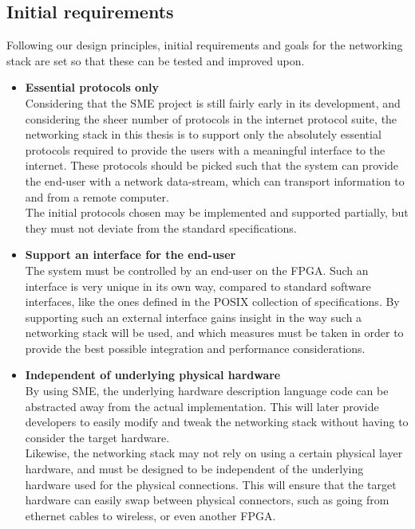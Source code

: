 \subsection{Initial requirements}
Following our design principles, initial requirements and goals for the
networking stack are set so that these can be tested and improved upon.
\begin{itemize}
\item \textbf{Essential protocols only}\\
Considering that the SME project is still fairly early in its development, and considering
the sheer number of protocols in the internet protocol suite, the networking
stack in this thesis is to support only the absolutely essential protocols
required to provide the users with a meaningful interface to the internet.
These protocols should be picked such that the system can provide the end-user
with a network data-stream, which can transport information to and from a remote
computer.\\
The initial protocols chosen may be implemented and supported partially, but
they must not deviate from the standard specifications.

\item \textbf{Support an interface for the end-user}\\
The system must be controlled by an end-user on the FPGA. Such an interface is
very unique in its own way, compared to standard software interfaces, like the
ones defined in the POSIX collection of specifications. By supporting such an
external interface gains insight in the way such a networking stack will be used,
and which measures must be taken in order to provide the best possible integration
and performance considerations.

\item \textbf{Independent of underlying physical hardware}\\
By using SME, the underlying hardware description language code can be abstracted
away from the actual implementation. This will later provide developers to easily
modify and tweak the networking stack without having to consider the target
hardware.\\
Likewise, the networking stack may not rely on using a certain physical layer hardware,
and must be designed to be independent of the underlying hardware used for the
physical connections. This will ensure that the target hardware can easily
swap between physical connectors, such as going from ethernet cables to wireless,
or even another FPGA.
\end{itemize}

